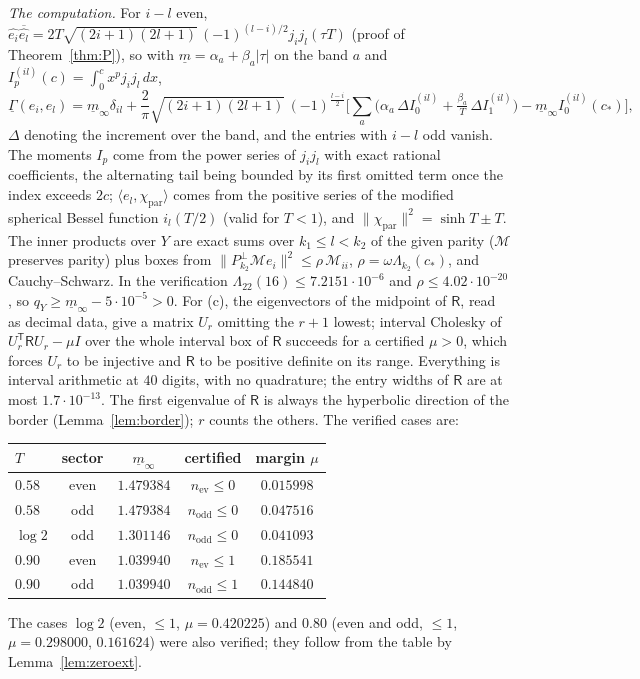 \documentclass[11pt]{amsart}
\theoremstyle{definition}
\theoremstyle{remark}
\begin{document}
\emph{The computation.} For $i-l$ even, $\widehat{e_i}\overline{\widehat{e_l}}=2T\sqrt{(2i+1)(2l+1)}\,
(-1)^{(l-i)/2}j_ij_l(\tau T)$ (proof of Theorem~\ref{thm:P}), so with $\underline m=\alpha_a+\beta_a|\tau|$
on the band $a$ and $I_p^{(il)}(c)=\int_0^cx^pj_ij_l\,dx$,
\[
\underline\Gamma(e_i,e_l)=\underline m_\infty\delta_{il}+\frac2\pi\sqrt{(2i+1)(2l+1)}\,(-1)^{\frac{l-i}2}
\Big[\sum_a\big(\alpha_a\,\Delta I^{(il)}_0+\tfrac{\beta_a}T\,\Delta I^{(il)}_1\big)-\underline m_\infty I^{(il)}_0(c_*)\Big],
\]
$\Delta$ denoting the increment over the band, and the entries with $i-l$ odd vanish. The moments
$I_p$ come from the power series of $j_ij_l$ with exact rational coefficients, the alternating tail being
bounded by its first omitted term once the index exceeds $2c$; $\langle e_l,\chi_{\mathrm{par}}\rangle$ comes
from the positive series of the modified spherical Bessel function $i_l(T/2)$ (valid for $T<1$), and
$\|\chi_{\mathrm{par}}\|^2=\sinh T\pm T$. The inner products over $Y$ are exact sums over $k_1\le l<k_2$ of
the given parity ($\mathcal M$ preserves parity) plus boxes from
$\|P^\perp_{k_2}\mathcal Me_i\|^2\le\rho\,\mathcal M_{ii}$, $\rho=\omega\Lambda_{k_2}(c_*)$, and
Cauchy--Schwarz. In the verification $\Lambda_{22}(16)\le7.2151\cdot10^{-6}$ and $\rho\le4.02\cdot10^{-20}$, so
$q_Y\ge\underline m_\infty-5\cdot10^{-5}>0$. For (c), the eigenvectors of the midpoint of $\mathsf R$,
read as decimal data, give a matrix $U_r$ omitting the $r+1$ lowest; interval Cholesky of
$U_r^{\mathsf T}\mathsf RU_r-\mu I$ over the whole interval box of $\mathsf R$ succeeds for a certified
$\mu>0$, which forces $U_r$ to be injective and $\mathsf R$ to be positive definite on its range.
Everything is interval arithmetic at $40$ digits, with no quadrature; the entry widths of $\mathsf R$ are
at most $1.7\cdot10^{-13}$. The first eigenvalue of $\mathsf R$ is always the hyperbolic direction of
the border (Lemma~\ref{lem:border}); $r$ counts the others. The verified cases are:
\begin{center}\small
\begin{tabular}{@{}lcccc@{}}
\toprule
$T$ & sector & $\underline m_\infty$ & certified & margin $\mu$\\
\midrule
$0.58$ & even & $1.479384$ & $n_{\mathrm{ev}}\le0$ & $0.015998$\\
$0.58$ & odd & $1.479384$ & $n_{\mathrm{odd}}\le0$ & $0.047516$\\
$\log2$ & odd & $1.301146$ & $n_{\mathrm{odd}}\le0$ & $0.041093$\\
$0.90$ & even & $1.039940$ & $n_{\mathrm{ev}}\le1$ & $0.185541$\\
$0.90$ & odd & $1.039940$ & $n_{\mathrm{odd}}\le1$ & $0.144840$\\
\bottomrule
\end{tabular}
\end{center}
The cases $\log2$ (even, $\le1$, $\mu=0.420225$) and $0.80$ (even and odd, $\le1$,
$\mu=0.298000$, $0.161624$) were also verified; they follow from the table by
Lemma~\ref{lem:zeroext}.
\end{document}
